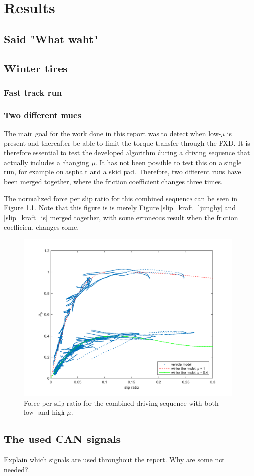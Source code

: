 \chapter{Results}

\section{Said "What waht"}

\section{Winter tires}

\subsection{Fast track run}


\subsection{Two different mues}
The main goal for the work done in this report was to detect when low-$ \mu $ is present and thereafter be able to limit the torque transfer through the FXD. It is therefore essential to test the developed algorithm during a driving sequence that actually includes a changing $ \mu $. It has not been possible to test this on a single run, for example on asphalt and a skid pad. Therefore, two different runs have been merged together, where the friction coefficient changes three times.

The normalized force per slip ratio for this combined sequence can be seen in Figure \ref{slip_kraft_comb2}. Note that this figure is is merely Figure \ref{slip_kraft_ljungby} and \ref{slip_kraft_is} merged together, with some erroneous result when the friction coefficient changes come. 

\begin{figure}[h]
	\centering
	\includegraphics[width=1.0\textwidth]{Pictures/slip_kraft_comb2}
	\caption {Force per slip ratio for the combined driving sequence with both low- and high-$ \mu $.}
	\label{slip_kraft_comb2}
\end{figure}



\section{The used CAN signals}
Explain which signals are used throughout the report. Why are some not needed?.
